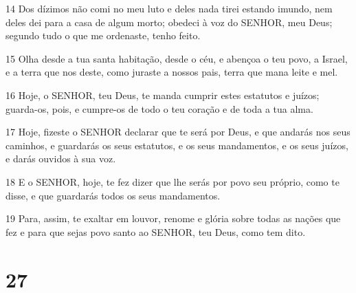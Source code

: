 \par 14 Dos dízimos não comi no meu luto e deles nada tirei estando imundo, nem deles dei para a casa de algum morto; obedeci à voz do SENHOR, meu Deus; segundo tudo o que me ordenaste, tenho feito.
\par 15 Olha desde a tua santa habitação, desde o céu, e abençoa o teu povo, a Israel, e a terra que nos deste, como juraste a nossos pais, terra que mana leite e mel.
\par 16 Hoje, o SENHOR, teu Deus, te manda cumprir estes estatutos e juízos; guarda-os, pois, e cumpre-os de todo o teu coração e de toda a tua alma.
\par 17 Hoje, fizeste o SENHOR declarar que te será por Deus, e que andarás nos seus caminhos, e guardarás os seus estatutos, e os seus mandamentos, e os seus juízos, e darás ouvidos à sua voz.
\par 18 E o SENHOR, hoje, te fez dizer que lhe serás por povo seu próprio, como te disse, e que guardarás todos os seus mandamentos.
\par 19 Para, assim, te exaltar em louvor, renome e glória sobre todas as nações que fez e para que sejas povo santo ao SENHOR, teu Deus, como tem dito.

\chapter{27}

